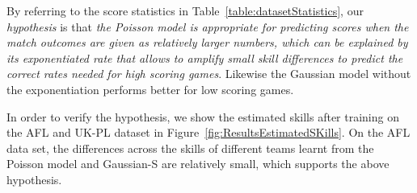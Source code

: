 \begin{center}
\begin{figure*}[t!]
 \centering
\caption{\small Results on the Halo 2 data set, evaluated using score
prediction error (right column). Error bars indicate
95\% confidence intervals.}
\label{fig:ScoreError_Halo}
\end{figure*}
\end{center}


\begin{center}
\begin{figure*}[t!]
 \centering
\caption{\small Results on the AFL data set, evaluated using score
prediction error (right column). Error bars indicate
95\% confidence intervals.}
\label{fig:ScoreError_AFL}
\end{figure*}
\end{center}


\COMMENT
By referring to the score
statistics in Table~\ref{table:datasetStatistics}, our {\it
hypothesis} is that {\it the Poisson model is appropriate for
predicting scores when the match outcomes are given as relatively
larger numbers, which can be explained by its exponentiated rate that
allows to amplify small skill differences to predict the correct rates
needed for high scoring games}. Likewise the Gaussian model without
the exponentiation performs better for low scoring games.

In order to verify the hypothesis, we show the estimated skills after
training on the AFL and UK-PL dataset in
Figure~\ref{fig:ResultsEstimatedSKills}. On the AFL data set, the
differences across the skills of different teams learnt from the
Poisson model and Gaussian-S are relatively small, which supports the
above hypothesis.

\begin{figure*}[t!]
 \centering
 \vspace{-3cm}
 \\
 \vspace{-1.5cm}
\caption{Estimated skill levels of teams on the AFL (left) and UK-PL
  data (right) sets. Error bar indicates standard deviation.}
\label{fig:ResultsEstimatedSKills}
\end{figure*}

